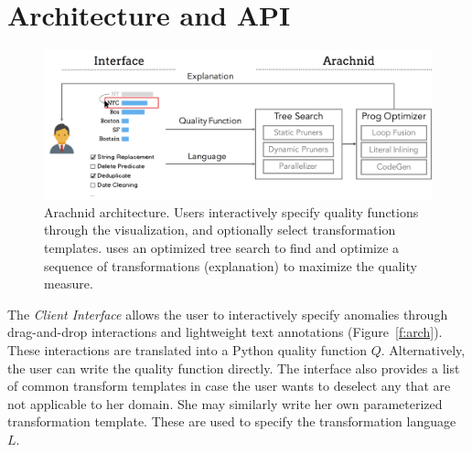 \section{Architecture and API}

\begin{figure}[t]
\centering
 \includegraphics[width=\columnwidth]{figures/arachnidarch.png}
 \caption{\small Arachnid architecture.  Users interactively specify quality functions through the visualization, and optionally select transformation templates. \sys uses an optimized tree search to find and optimize a sequence of transformations (explanation) to maximize the quality measure.   \label{fig:arch} }

\end{figure}

The {\it Client Interface} allows the user to interactively specify anomalies through drag-and-drop interactions and lightweight text annotations (Figure~\ref{f:arch}).   These interactions are translated into a Python quality function $Q$.  Alternatively, the user can write the quality function directly.    The interface also provides a list of common transform templates in case the user wants to deselect any that are not applicable to her domain.  She may similarly write her own parameterized transformation template.  These are used to specify the transformation language $L$.

